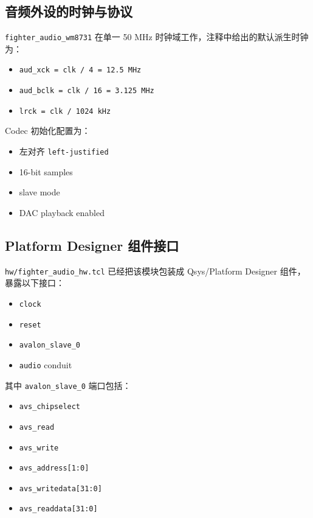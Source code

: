 \documentclass[12pt,a4paper]{ctexart}
\begin{document}
\subsection{音频外设的时钟与协议}

\texttt{fighter\_audio\_wm8731} 在单一 50 MHz 时钟域工作，注释中给出的默认派生时钟为：

\begin{itemize}
  \item \texttt{aud\_xck = clk / 4 = 12.5 MHz}
  \item \texttt{aud\_bclk = clk / 16 = 3.125 MHz}
  \item \texttt{lrck = clk / 1024  kHz}
\end{itemize}

Codec 初始化配置为：

\begin{itemize}
  \item 左对齐 \texttt{left-justified}
  \item 16-bit samples
  \item slave mode
  \item DAC playback enabled
\end{itemize}

\subsection{Platform Designer 组件接口}

\texttt{hw/fighter\_audio\_hw.tcl} 已经把该模块包装成 Qsys/Platform Designer 组件，暴露以下接口：

\begin{itemize}
  \item \texttt{clock}
  \item \texttt{reset}
  \item \texttt{avalon\_slave\_0}
  \item \texttt{audio} conduit
\end{itemize}

其中 \texttt{avalon\_slave\_0} 端口包括：

\begin{itemize}
  \item \texttt{avs\_chipselect}
  \item \texttt{avs\_read}
  \item \texttt{avs\_write}
  \item \texttt{avs\_address[1:0]}
  \item \texttt{avs\_writedata[31:0]}
  \item \texttt{avs\_readdata[31:0]}
\end{itemize}
\end{document}
